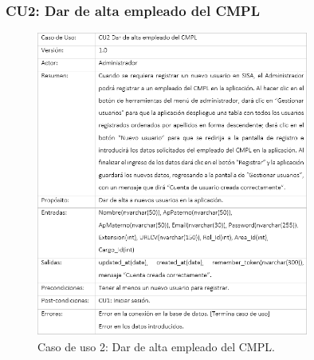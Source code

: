 		\subsubsection{CU2: Dar de alta empleado del CMPL}
			\begin{figure}[htbp!]
				\centering
					\includegraphics[width=0.8\textwidth]{images/CU/CU2}
					\caption{Caso de uso 2: Dar de alta empleado del CMPL.}
				\label{Tabla}
			\end{figure}
			
